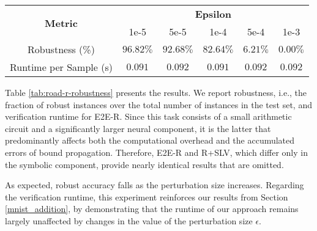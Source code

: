 \begin{table*}[!t]
    \renewcommand{\arraystretch}{1.2}
    \centering
    \begin{tabular}{cccccc}
        \hline \hline
        \multirow{2}{*}{\textbf{Metric}} & \multicolumn{5}{c}{\textbf{Epsilon}} \\ 
        & 1e-5      & 5e-5      & 1e-4      & 5e-4     & 1e-3 \\ \hline
        Robustness (\%) & $96.82\%$ & $92.68\%$ & $82.64\%$ & $6.21\%$ & $0.00\%$ \\
        Runtime per Sample (s) & $0.091$ & $0.092$ & $0.091$ & $0.092$ & $0.092$ \\
        \hline \hline
    \end{tabular}
    \caption{Autonomous driving experiment results, indicating robustness and verification runtime for five values of the $\epsilon$-perturbation.}
    \label{tab:road-r-robustness}
\end{table*}

Table \ref{tab:road-r-robustness} presents the results. We report robustness, i.e., the fraction of robust instances over the total number of instances in the test set, and verification runtime for \textsc{E2E-R}. Since this task consists of a small arithmetic circuit and a significantly larger neural component, it is the latter that predominantly affects both the computational overhead and the accumulated errors of bound propagation. Therefore, \textsc{E2E-R} and \textsc{R+SLV}, which differ only in the symbolic component, provide nearly identical results that are omitted.

As expected, robust accuracy falls as the perturbation size increases. Regarding the verification runtime, this experiment reinforces our results from Section \ref{mnist_addition}, by demonstrating that the runtime of our approach remains largely unaffected by changes in the value of the perturbation size $\epsilon$.




